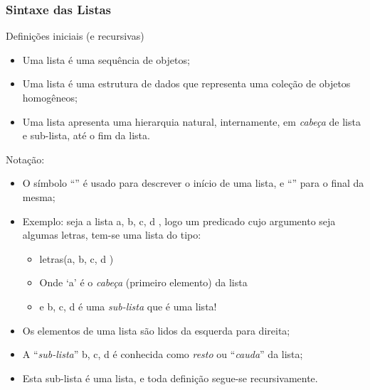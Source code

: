 \begin{frame}[fragile, allowframebreaks=0.9]
 \frametitle{Sintaxe das Listas}


\begin{block}{Definições iniciais (e recursivas)}
\begin{itemize}


\item Uma lista é uma sequência de objetos;

\item Uma lista é uma estrutura de dados que representa
uma coleção de objetos homogêneos;

\item Uma lista  apresenta uma hierarquia natural, internamente,
em \textit{cabeça} de lista e sub-lista, até o fim da lista.

\end{itemize}
\end{block}

\framebreak
\begin{block}{Notação:}
\begin{itemize}
   \item O símbolo ``\lbrack'' é usado para descrever o início de uma lista,
e ``\rbrack'' para o final da mesma;

   \item Exemplo: seja a lista \lbrack a, b, c, d \rbrack,  logo um predicado cujo
argumento seja algumas letras,  tem-se uma lista do tipo:\\
  \begin{itemize}
  \item letras(\lbrack  a, b, c, d \rbrack )
 \item Onde `a' é  o   \textit{cabeça} (primeiro elemento) da lista
 \item e \lbrack b, c, d \rbrack é uma \textit{sub-lista} que é uma lista!
  \end{itemize}

\item Os elementos de uma lista são lidos da esquerda para direita;

\item  A ``{\em sub-lista}'' \lbrack b,  c, d \rbrack é conhecida como  \textit{resto} ou ``{\em cauda}'' da lista;
        
\item   Esta sub-lista é uma lista, e toda definição segue-se recursivamente.
 \end{itemize} 


\end{block}
\end{frame}
